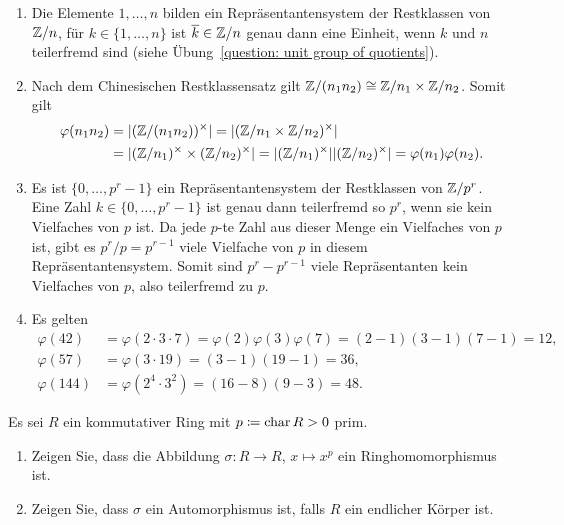 \begin{solution}
  \begin{enumerate}
    \item
      Die Elemente $1, \dotsc, n$ bilden ein Repräsentantensystem der Restklassen von $\mathbb{Z}/n$, für $k \in \{1, \dotsc, n\}$ ist $\overline{k} \in \mathbb{Z}/n$ genau dann eine Einheit, wenn $k$ und $n$ teilerfremd sind (siehe Übung~\ref{question: unit group of quotients}).
    \item
      Nach dem Chinesischen Restklassensatz gilt $\mathbb{Z}/(n_1 n_2) \cong \mathbb{Z}/n_1 \times \mathbb{Z}/n_2$.
      Somit gilt
      \begin{align*}
            \varphi(n_1 n_2)
        &=  | (\mathbb{Z}/(n_1 n_2))^\times |
         =  | (\mathbb{Z}/n_1 \times \mathbb{Z}/n_2)^\times |
        \\
        &=  | (\mathbb{Z}/n_1)^\times \times (\mathbb{Z}/n_2)^\times |
         =  | (\mathbb{Z}/n_1)^\times | | (\mathbb{Z}/n_2)^\times |
         =  \varphi(n_1) \varphi(n_2).
      \end{align*}
    \item
      Es ist $\{0, \dotsc, p^r - 1\}$ ein Repräsentantensystem der Restklassen von $\mathbb{Z}/p^r$.
      Eine Zahl $k \in \{0, \dotsc, p^r - 1\}$ ist genau dann teilerfremd so $p^r$, wenn sie kein Vielfaches von $p$ ist.
      Da jede $p$-te Zahl aus dieser Menge ein Vielfaches von $p$ ist, gibt es $p^r/p = p^{r-1}$ viele Vielfache von $p$ in diesem Repräsentantensystem.
      Somit sind $p^r - p^{r-1}$ viele Repräsentanten kein Vielfaches von $p$, also teilerfremd zu $p$.
    \item
      Es gelten
      \begin{align*}
            \varphi(42)
        &=  \varphi(2 \cdot 3 \cdot 7)
         =  \varphi(2) \varphi(3) \varphi(7)
         =  (2 - 1)(3 - 1)(7 - 1)
         =  12,
        \\
            \varphi(57)
        &=  \varphi(3 \cdot 19)
         =  (3 - 1)(19 - 1)
         =  36,
        \\
            \varphi(144)
        &=  \varphi(2^4 \cdot 3^2)
         =  (16 - 8) (9 - 3)
         =  48.
      \end{align*}
  \end{enumerate}
\end{solution}


\begin{question}[subtitle = Der Frobeniushomomorphismus]
  \label{question: the frobenius homomorphism}
  Es sei $R$ ein kommutativer Ring mit $p \coloneqq \operatorname{char} R > 0$ prim.
  \begin{enumerate}
    \item
      Zeigen Sie, dass die Abbildung $\sigma \colon R \to R$, $x \mapsto x^p$ ein Ringhomomorphismus ist.
    \item
      Zeigen Sie, dass $\sigma$ ein Automorphismus ist, falls $R$ ein endlicher Körper ist.
  \end{enumerate}
\end{question}


